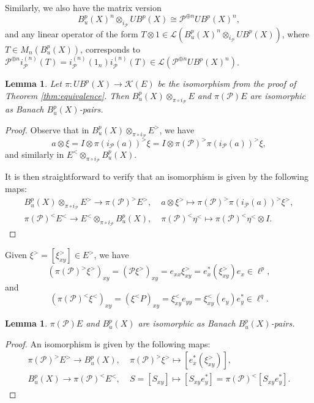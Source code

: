 \documentclass[a4,11pt]{amsart}
\newtheorem{lem}[thm]{Lemma}
\theoremstyle{remark}
\begin{document}
Similarly, we also have the matrix version
\[ B^p_u(X)^n\otimes_{i_\mathcal{P}}UB^p(X)\cong \mathcal{P}^{\oplus n}UB^p(X)^n, \]
and any linear operator of the form $T\otimes 1\in\mathcal{L}(B^p_u(X)^n\otimes_{i_\mathcal{P}}UB^p(X))$, where $T\in M_n(B^p_u(X))$, corresponds to $\mathcal{P}^{\oplus n}i_\mathcal{P}^{(n)}(T)=i_\mathcal{P}^{(n)}(1_n)i_\mathcal{P}^{(n)}(T)\in\mathcal{L}(\mathcal{P}^{\oplus n}UB^p(X)^n)$.


\begin{lem}
Let $\pi:UB^p(X)\rightarrow\mathcal{K}(E)$ be the isomorphism from the proof of Theorem \ref{thm:equivalence}. Then $B^p_u(X)\otimes_{\pi\circ i_\mathcal{P}}E$ and $\pi(\mathcal{P})E$ are isomorphic as Banach $B^p_u(X)$-pairs.
\end{lem}

\begin{proof}
Observe that in $B^p_u(X)\otimes_{\pi\circ i_\mathcal{P}}E^>$, we have
\[ a\otimes\xi = I\otimes\pi(i_\mathcal{P}(a))^>\xi = I\otimes\pi(\mathcal{P})^>\pi(i_\mathcal{P}(a))^>\xi, \]
and similarly in $E^<\otimes_{\pi\circ i_\mathcal{P}}B^p_u(X)$.

It is then straightforward to verify that an isomorphism is given by the following maps:
\begin{align*}
B^p_u(X)\otimes_{\pi\circ i_\mathcal{P}}E^>\rightarrow\pi(\mathcal{P})^>E^>, &\; a\otimes \xi^>\mapsto \pi(\mathcal{P})^>\pi(i_\mathcal{P}(a))^>\xi^>, \\
\pi(\mathcal{P})^<E^<\rightarrow E^<\otimes_{\pi\circ i_\mathcal{P}}B^p_u(X), &\; \pi(\mathcal{P})^<\eta^<\mapsto \pi(\mathcal{P})^<\eta^<\otimes I.
\end{align*} 
\end{proof}


Given $\xi^>=[\xi^>_{xy}]\in E^>$, we have
\[ (\pi(\mathcal{P})^>\xi^>)_{xy}=(\mathcal{P}\xi^>)_{xy}=e_{xx}\xi^>_{xy}=e_x^*(\xi^>_{xy})e_x\in\ell^p,\]
and \[ (\pi(\mathcal{P})^<\xi^<)_{xy}=(\xi^<P)_{xy}=\xi^<_{xy}e_{yy}=\xi^<_{xy}(e_y)e_y^*\in\ell^q.\] 


\begin{lem}
$\pi(\mathcal{P})E$ and $B^p_u(X)$ are isomorphic as Banach $B^p_u(X)$-pairs.
\end{lem}

\begin{proof}
An isomorphism is given by the following maps:
\begin{align*}
\pi(\mathcal{P})^>E^>\rightarrow B^p_u(X), &\; \pi(\mathcal{P})^>\xi^>\mapsto [e_x^*(\xi^>_{xy})], \\
B^p_u(X)\rightarrow \pi(\mathcal{P})^<E^<, &\; S=[S_{xy}]\mapsto [S_{xy}e_y^*]=\pi(\mathcal{P})^<[S_{xy}e_y^*].
\end{align*} 
\end{proof}
\end{document}
